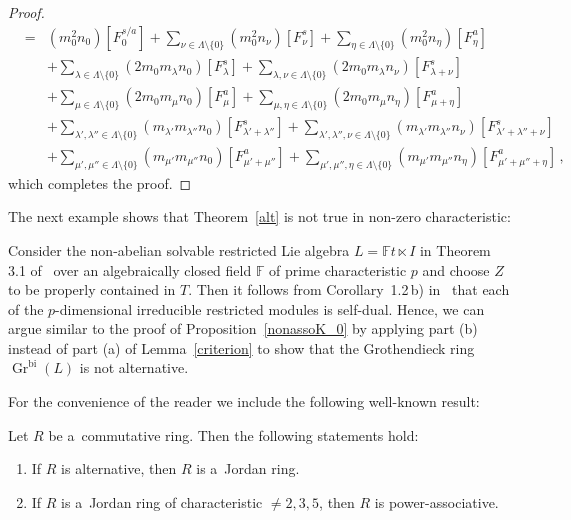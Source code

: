 \documentclass{jonasart}
\DeclareMathOperator{\bi}{bi}
\DeclareMathOperator{\K}{Gr}
\newcommand{\fbb}{\mathbb{F}}
\begin{document}
\begin{proof}
\begin{eqnarray*}
			& = & (m_0^2 n_0 )[F_0^{s/a}]+\sum_{\nu\in\Lambda\setminus\{0\}}(m_0^2 n_\nu)[F_\nu^s ]
			+\sum_{\eta\in\Lambda\setminus\{0\}}(m_0^2 n_\eta)[F_\eta^a ]\\
			&& +\sum_{\lambda\in\Lambda\setminus\{0\}}(2m_0 m_\lambda n_0 )[F_\lambda^s ]
			+\sum_{\lambda,\nu\in\Lambda\setminus\{0\}}(2m_0 m_\lambda n_\nu)[F_{\lambda+\nu}^s ]\\
			&& +\sum_{\mu\in\Lambda\setminus\{0\}}(2m_0 m_\mu n_0 )[F_\mu^a ]
			+\sum_{\mu,\eta\in\Lambda\setminus\{0\}}(2m_0 m_\mu n_\eta)[F_{\mu+\eta}^a ]\\
			&& +\sum_{\lambda',\lambda''\in\Lambda\setminus\{0\}}(m_{\lambda'}m_{\lambda''}n_0 )
			[F_{\lambda'+\lambda''}^s ]
			+\sum_{\lambda',\lambda'',\nu\in\Lambda\setminus\{0\}}(m_{\lambda'}m_{\lambda''}n_\nu)
			[F_{\lambda'+\lambda''+\nu}^s ]\\
			&& +\sum_{\mu',\mu''\in\Lambda\setminus\{0\}}(m_{\mu'}m_{\mu''}n_0 )[F_{\mu'+\mu''}^a ]
			+\sum_{\mu', \mu'', \eta\in\Lambda\setminus\{0\}}(m_{\mu'}m_{\mu''}n_\eta)[F_{\mu'+\mu''+\eta}^a ]\,,
		\end{eqnarray*}
		which completes the proof.
	\end{proof}

	The next example shows that Theorem~\ref{alt} is not true in non-zero characteristic:
	\begin{example}\label{primchar}
		{Consider the non-abelian solvable restricted Lie algebra $L=\fbb t\ltimes I$ in
		Theorem 3.1 of~\cite{FS} over an algebraically closed field $\fbb$ of prime characteristic
		$p$ and choose $Z$ to be properly contained in $T$. Then it follows from Corollary~1.2\,b)
		in~\cite{F-1} that each of the $p$-dimensional irreducible restricted modules is self-dual. Hence, we can argue similar to the proof of Proposition~\ref{nonassoK_0}
		by applying part (b) instead of part (a) of Lemma~\ref{criterion} to show that the
		Grothendieck ring $\K^{\bi}(L)$ is not alternative.}
	\end{example}
	For the convenience of the reader we include the following well-known result:
	\begin{lemma}\label{jordanpowerasso}
		Let $R$ be a~commutative ring. Then the following statements hold:
		\begin{enumerate}
			\item[\textrm{(a)}] If $R$ is alternative, then $R$ is a~Jordan ring.
			\item[\textrm{(b)}] If $R$ is a~Jordan ring of characteristic $\ne 2,3,5$, then $R$ is power-associative.
		\end{enumerate}
	\end{lemma}
\end{document}
